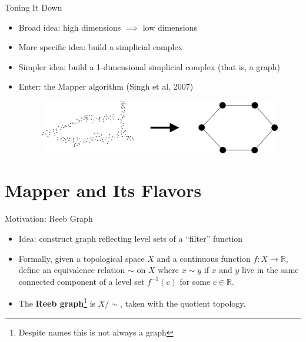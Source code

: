 \documentclass{beamer}
\begin{document}
\begin{frame}{Toning It Down}
  \begin{itemize}
    \item Broad idea: high dimensions $\implies$ low dimensions
    \item More specific idea: build a simplicial complex
    \item Simpler idea: build a 1-dimensional simplicial complex (that is, a graph)
    \item Enter: the Mapper algorithm (Singh et al, 2007)
    \vspace*{.5cm}
  \begin{figure}
    \begin{center}
      \hspace*{-1cm}\includegraphics[width=1\textwidth]{datatograph.png}
    \end{center}
  \end{figure}
  \end{itemize}
\end{frame}

\section{Mapper and Its Flavors}
\begin{frame}{Motivation: Reeb Graph}
  \begin{itemize}
    \item Idea: construct graph reflecting level sets of a ``filter'' function
    \item Formally, given a topological space $X$ and a continuous function 
    $f: X\to\mathbb{R}$, define an equivalence relation $\sim$ on $X$ where $x\sim y$ if $x$ and $y$ live in the same connected component of a level set $f^{-1}(c)$ for some $c\in\mathbb{R}$.
    \item The \textbf{Reeb graph}\footnote{Despite names this is not always a graph} is $X/\sim$, taken with the quotient topology.
  \end{itemize}
\end{frame}
\end{document}
